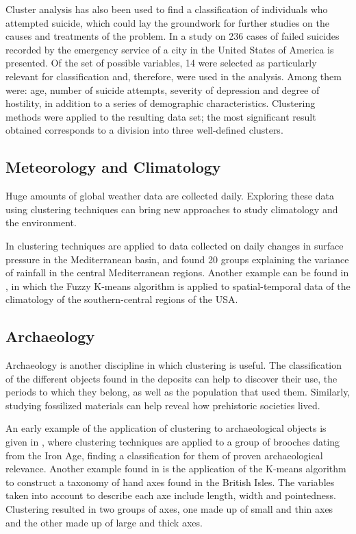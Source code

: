 Cluster analysis has also been used to find a classification of individuals who attempted suicide, which could lay the groundwork for further studies on the causes and treatments of the problem. In \cite{paykel1978classification} a study on 236 cases of failed suicides recorded by the emergency service of a city in the United States of America is presented. Of the set of possible variables, 14 were selected as particularly relevant for classification and, therefore, were used in the analysis. Among them were: age, number of suicide attempts, severity of depression and degree of hostility, in addition to a series of demographic characteristics. Clustering methods were applied to the resulting data set; the most significant result obtained corresponds to a division into three well-defined clusters.

\subsection{Meteorology and Climatology}

Huge amounts of global weather data are collected daily. Exploring these data using clustering techniques can bring new approaches to study climatology and the environment.

In \cite{littmann2000empirical} clustering techniques are applied to data collected on daily changes in surface pressure in the Mediterranean basin, and found 20 groups explaining the variance of rainfall in the central Mediterranean regions. Another example can be found in \cite{liu2005mining}, in which the Fuzzy K-means algorithm is applied to spatial-temporal data of the climatology of the southern-central regions of the USA. 

\subsection{Archaeology}

Archaeology is another discipline in which clustering is useful. The classification of the different objects found in the deposits can help to discover their use, the periods to which they belong, as well as the population that used them. Similarly, studying fossilized materials can help reveal how prehistoric societies lived. 

An early example of the application of clustering to archaeological objects is given in \cite{hodson1966some}, where clustering techniques are applied to a group of brooches dating from the Iron Age, finding a classification for them of proven archaeological relevance. Another example found in \cite{hodson1971numerical} is the application of the K-means algorithm to construct a taxonomy of hand axes found in the British Isles. The variables taken into account to describe each axe include length, width and pointedness. Clustering resulted in two groups of axes, one made up of small and thin axes and the other made up of large and thick axes.

